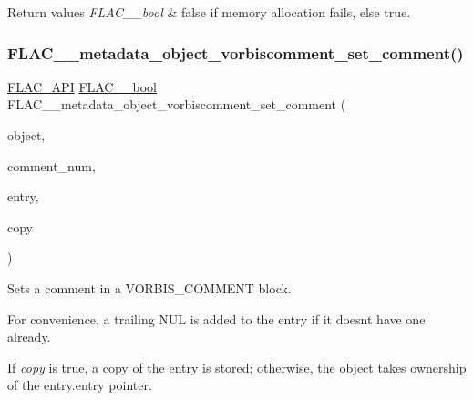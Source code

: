\begin{DoxyRetVals}{Return values}
{\em F\+L\+A\+C\+\_\+\+\_\+bool} & {\ttfamily false} if memory allocation fails, else {\ttfamily true}. \\
\hline
\end{DoxyRetVals}
\mbox{\label{group__flac__metadata__object_gadf034b2c385e7932c6be2d724a0deae3}} 
\subsubsection{\texorpdfstring{FLAC\_\_metadata\_object\_vorbiscomment\_set\_comment()}{FLAC\_\_metadata\_object\_vorbiscomment\_set\_comment()}}
{\footnotesize\ttfamily \mbox{\hyperlink{group__flac__export_ga56ca07df8a23310707732b1c0007d6f5}{F\+L\+A\+C\+\_\+\+A\+PI}} \mbox{\hyperlink{ordinals_8h_a95103469f1cbd78b8cf250194985b34e}{F\+L\+A\+C\+\_\+\+\_\+bool}} F\+L\+A\+C\+\_\+\+\_\+metadata\+\_\+object\+\_\+vorbiscomment\+\_\+set\+\_\+comment (\begin{DoxyParamCaption}\item[{\mbox{\hyperlink{struct_f_l_a_c_____stream_metadata}{F\+L\+A\+C\+\_\+\+\_\+\+Stream\+Metadata}} $\ast$}]{object,  }\item[{unsigned}]{comment\+\_\+num,  }\item[{\mbox{\hyperlink{struct_f_l_a_c_____stream_metadata___vorbis_comment___entry}{F\+L\+A\+C\+\_\+\+\_\+\+Stream\+Metadata\+\_\+\+Vorbis\+Comment\+\_\+\+Entry}}}]{entry,  }\item[{\mbox{\hyperlink{ordinals_8h_a95103469f1cbd78b8cf250194985b34e}{F\+L\+A\+C\+\_\+\+\_\+bool}}}]{copy }\end{DoxyParamCaption})}

Sets a comment in a V\+O\+R\+B\+I\+S\+\_\+\+C\+O\+M\+M\+E\+NT block.

For convenience, a trailing N\+UL is added to the entry if it doesn\textquotesingle{}t have one already.

If {\itshape copy} is {\ttfamily true}, a copy of the entry is stored; otherwise, the object takes ownership of the {\ttfamily entry.\+entry} pointer.

